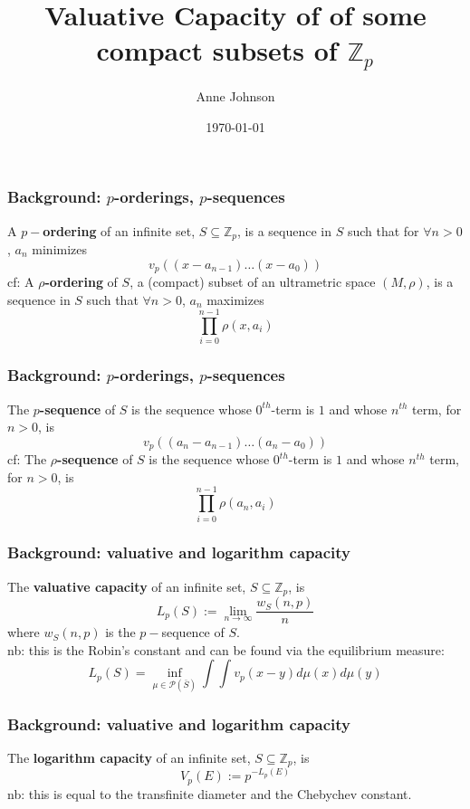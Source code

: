 \documentclass{beamer}
\title{Valuative Capacity of of some compact subsets of $\mathbb{Z}_p$}
\author{Anne Johnson}
\date{\today}
\theoremstyle{definition}
\begin{document}
\maketitle

\begin{frame}
\frametitle{Background: $p$-orderings, $p$-sequences}
A \textbf{$p-$ordering} of an infinite set, $S \subseteq \mathbb{Z}_p$, is a sequence in $S$ such that for $\forall n > 0$, $a_n$ minimizes
\[v_p((x - a_{n-1}) \ldots (x - a_0))\] 
\pause \newline
cf: A \textbf{$\rho$-ordering} of $S$, a (compact) subset of an ultrametric space $(M, \rho)$,  is a sequence in $S$ such that $\forall n > 0$, $a_n$ maximizes 
\[\prod_{i=0}^{n-1} \rho(x,a_i)\] 
\end{frame}

\begin{frame}
\frametitle{Background: $p$-orderings, $p$-sequences}

 The \textbf{$p$-sequence} of $S$ is the sequence whose $0^{th}$-term is $1$ and whose $n^{th}$ term, for $n >0$, is 
\[v_p ((a_n-a_{n-1}) \ldots (a_n - a_0))\]
\pause \newline
cf:  The \textbf{$\rho$-sequence} of $S$ is the sequence whose $0^{th}$-term is $1$ and whose $n^{th}$ term, for $n >0$, is
\[\prod_{i=0}^{n-1} \rho(a_n,a_i)\]

\end{frame}


\begin{frame}
\frametitle{Background: valuative and logarithm capacity}
 The \textbf{valuative capacity} of an infinite set, $S \subseteq \mathbb{Z}_p$, is
\[ L_p(S) := \lim_{n\to\infty}  \frac{w_S(n,p)}{n}\]
where $w_S(n,p)$ is the $p-$sequence of $S$. 
\newline
\\nb: this is the Robin's constant and can be found via the equilibrium measure:
 \[L_p(S) = \inf_{\mu\in\mathcal{P}(\bar{S}) } \int \int v_p(x-y)d\mu(x)d\mu(y)\]
\end{frame}

\begin{frame}
\frametitle{Background: valuative and logarithm capacity}
 The \textbf{logarithm capacity} of an infinite set, $S \subseteq \mathbb{Z}_p$, is
\[ V_p(E) := p^{-L_p(E)}\]
\newline
nb: this is equal to the transfinite diameter and the Chebychev constant.
\pause \newline
\end{frame}
\end{document}
